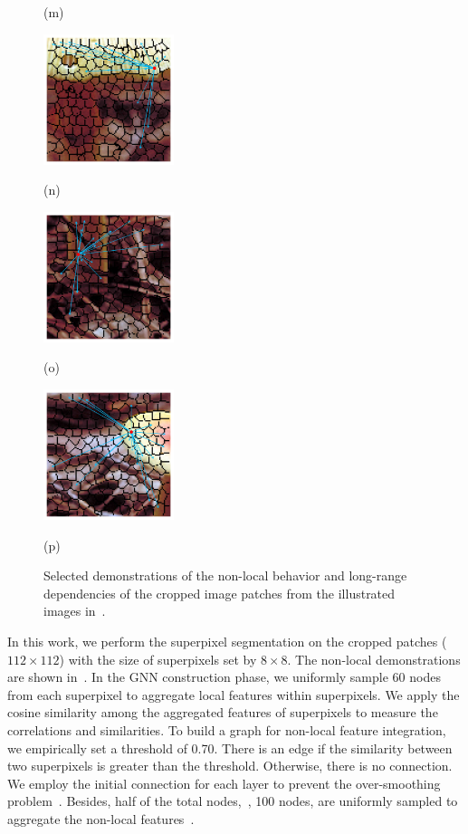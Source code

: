 \begin{figure}[]
\begin{minipage}[t]{.24\linewidth}
		\centerline{(m)}
	\end{minipage}
	\begin{minipage}[t]{.24\linewidth}
		\includegraphics[width=1.5in]{cropped/shroom_superpixel_5.jpg}
		\centerline{(n)}
	\end{minipage}
	\begin{minipage}[t]{.24\linewidth}
		\includegraphics[width=1.5in]{cropped/shroom_superpixel_13.jpg}
		\centerline{(o)}
	\end{minipage}
	\begin{minipage}[t]{.24\linewidth}
		\includegraphics[width=1.5in]{cropped/shroom_superpixel_15.jpg}
		\centerline{(p)}
	\end{minipage}
	\caption{Selected demonstrations of the non-local behavior and long-range dependencies of the cropped image patches from the illustrated images in~.}
	\label{Non-local Behavior of the cropped patches with superpixels}
\end{figure}

In this work, we perform the superpixel segmentation on the cropped patches ($112 \times 112$) with the size of superpixels set by $8 \times 8$. The non-local demonstrations are shown in~. In the GNN construction phase, we uniformly sample 60 nodes from each superpixel to aggregate local features within superpixels. We apply the cosine similarity among the aggregated features of superpixels to measure the correlations and similarities. To build a graph for non-local feature integration, we empirically set a threshold of 0.70. There is an edge if the similarity between two superpixels is greater than the threshold. Otherwise, there is no connection. We employ the initial connection for each layer to prevent the over-smoothing problem~\citep{chen2020simple}. Besides, half of the total nodes,~\ie, 100 nodes, are uniformly sampled to aggregate the non-local features~\citep{wang2018non}.

